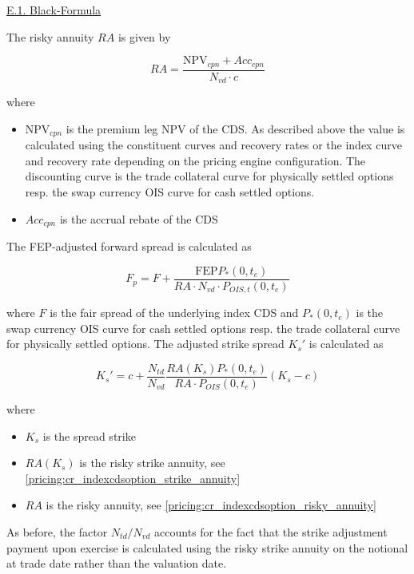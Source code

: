 \underline{E.1. Black-Formula}

The risky annuity $RA$ is given by

\begin{equation}\label{pricing:cr_indexcdsoption_risky_annuity}
RA = \frac{\text{NPV}_{cpn} + Acc_{cpn}}{N_{vd} \cdot c}
\end{equation}

where

\begin{itemize}
\item $\text{NPV}_{cpn}$ is the premium leg NPV of the CDS. As described above the value is calculated using the
  constituent curves and recovery rates or the index curve and recovery rate depending on the pricing engine
  configuration. The discounting curve is the trade collateral curve for physically settled options resp. the swap
  currency OIS curve for cash settled options.
\item $Acc_{cpn}$ is the accrual rebate of the CDS
\end{itemize}

The FEP-adjusted forward spread is calculated as

\begin{equation}
F_p = F + \frac{\text{FEP}P_{*}(0,t_e)}{RA \cdot N_{vd} \cdot P_{OIS,t}(0,t_e)}
\end{equation}

where $F$ is the fair spread of the underlying index CDS and $P_{*}(0,t_e)$ is the swap currency OIS curve for cash
settled options resp. the trade collateral curve for physically settled options. The adjusted strike spread $K_s'$ is
calculated as

\begin{equation}
K_s' = c + \frac{N_{td}}{N_{vd}}\frac{RA(K_s)P_{*}(0,t_e)}{RA\cdot P_{OIS}(0,t_e)} \left( K_s - c \right)
\end{equation}

where

\begin{itemize}
\item $K_s$ is the spread strike
\item $RA(K_s)$ is the risky strike annuity, see \ref{pricing:cr_indexcdsoption_strike_annuity}
\item $RA$ is the risky annuity, see \ref{pricing:cr_indexcdsoption_risky_annuity}
\end{itemize}

As before, the factor $N_{td} / N_{vd}$ accounts for the fact that the strike adjustment payment upon exercise is
calculated using the risky strike annuity on the notional at trade date rather than the valuation date.

